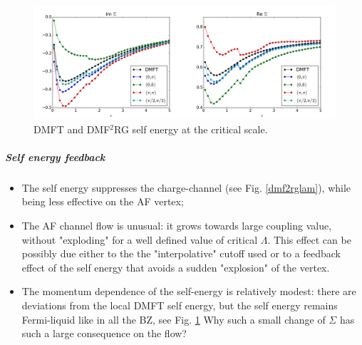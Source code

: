 \begin{figure}
\includegraphics[scale=0.25]{images/Merged_dmf2rg_se_freq.png}
\caption{DMFT and DMF$^2$RG self energy at the critical scale.} \label{dmf2self}
\end{figure}



\subparagraph{Self energy feedback}
\begin{itemize}
\item The self energy suppresses the charge-channel (see Fig. \ref{dmf2rglam}), while being less effective on the AF vertex; 
\item 	The AF channel flow is unusual: it grows towards large coupling value, without "exploding" for a well defined value of critical $\Lambda$. This effect can be possibly due either to the the "interpolative" cutoff used or to a feedback effect of the self energy that avoids a sudden "explosion" of the vertex. 
\item The momentum dependence of the self-energy is relatively modest: there are deviations from the local DMFT self energy, but the self energy remains Fermi-liquid like in all the BZ, see Fig. \ref{dmf2self} Why such a small change of $\Sigma$ has such a large consequence on the flow? 
\end{itemize} 

